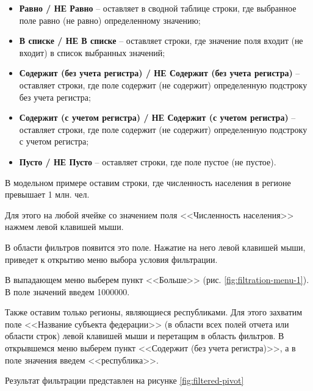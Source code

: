 \documentclass[../user-manual.tex]{subfiles}
\begin{document}
	\begin{itemize}
		
		\item \textbf{Равно / НЕ Равно} -- оставляет в сводной таблице строки, где выбранное поле равно (не равно) определенному значению;
		
		\item \textbf{В списке / НЕ В списке} -- оставляет строки, где значение поля входит (не входит) в список выбранных значений;
		
		\item \textbf{Содержит (без учета регистра) / НЕ Содержит (без учета регистра)} -- оставляет строки, где поле содержит (не содержит) определенную подстроку без учета регистра;
		
		\item \textbf{Содержит (с учетом регистра) / НЕ Содержит (с учетом регистра)} -- оставляет строки, где поле содержит (не содержит) определенную подстроку с учетом регистра;
		
		\item \textbf{Пусто / НЕ Пусто} -- оставляет строки, где поле пустое (не пустое).
		
	\end{itemize}

	\begin{modelExample}
		В модельном примере оставим строки, где численность населения в регионе превышает 1 млн. чел.
	
		Для этого на любой ячейке со значением поля <<Численность населения>> нажмем левой клавишей мыши.
	
		В области фильтров появится это поле. Нажатие на него левой клавишей мыши, приведет к открытию меню выбора условия фильтрации.
	
		В выпадающем меню выберем пункт <<Больше>> (рис. \ref{fig:filtration-menu-1}). В поле значений введем 1000000.
	
		Также оставим только регионы, являющиеся республиками. Для этого захватим поле <<Название субъекта федерации>> (в области всех полей отчета или области строк) левой клавишей мыши и перетащим в область фильтров. В открывшемся меню выберем пункт <<Содержит (без учета регистра)>>, а в поле значения введем <<республика>>.

		Результат фильтрации представлен на рисунке \ref{fig:filtered-pivot}
	\end{modelExample}
\end{document}
